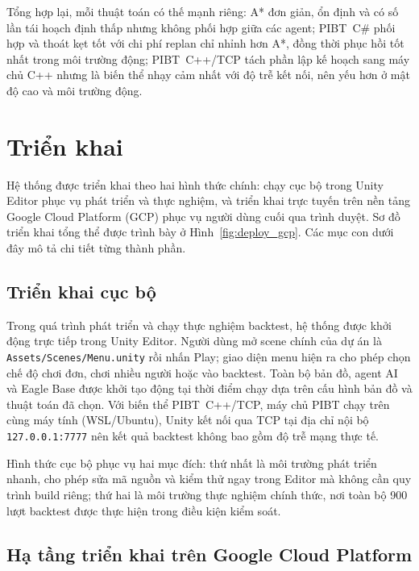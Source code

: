 \documentclass[../DoAn.tex]{subfiles}
\begin{document}
Tổng hợp lại, mỗi thuật toán có thế mạnh riêng: A* đơn giản, ổn định và có số lần tái hoạch định
thấp nhưng không phối hợp giữa các agent; PIBT~C\# phối hợp và thoát kẹt tốt với chi phí replan chỉ
nhỉnh hơn A*, đồng thời phục hồi tốt nhất trong môi trường
động; PIBT~C++/TCP tách phần lập kế hoạch sang máy chủ C++ nhưng là biến thể nhạy cảm nhất với độ
trễ kết nối, nên yếu hơn ở mật độ cao và môi trường động.

\section{Triển khai}
\label{sec:deployment}

Hệ thống được triển khai theo hai hình thức chính: chạy cục bộ trong Unity Editor phục vụ
phát triển và thực nghiệm, và triển khai trực tuyến trên nền tảng Google Cloud Platform
(GCP) phục vụ người dùng cuối qua trình duyệt. Sơ đồ triển khai tổng thể được trình bày ở
Hình~\ref{fig:deploy_gcp}. Các mục con dưới đây mô tả chi tiết từng thành phần.

\subsection{Triển khai cục bộ}

Trong quá trình phát triển và chạy thực nghiệm backtest, hệ thống được khởi động trực tiếp
trong Unity Editor. Người dùng mở scene chính của dự án là
\texttt{Assets/\allowbreak Scenes/\allowbreak Menu.unity} rồi nhấn Play; giao diện menu
hiện ra cho phép chọn chế độ chơi đơn, chơi nhiều người hoặc vào
backtest. Toàn bộ bản đồ, agent AI và Eagle Base được khởi tạo động tại thời điểm chạy dựa
trên cấu hình bản đồ và thuật toán đã chọn. Với biến thể PIBT~C++/TCP, máy chủ PIBT chạy
trên cùng máy tính (WSL/Ubuntu), Unity kết nối qua TCP tại địa chỉ nội bộ
\texttt{127.0.0.1:7777} nên kết quả backtest không bao gồm độ trễ mạng thực tế.

Hình thức cục bộ phục vụ hai mục đích: thứ nhất là môi trường phát triển nhanh, cho phép
sửa mã nguồn và kiểm thử ngay trong Editor mà không cần quy trình build riêng; thứ hai là
môi trường thực nghiệm chính thức, nơi toàn bộ 900 lượt backtest được thực hiện trong
điều kiện kiểm soát.

\subsection{Hạ tầng triển khai trên Google Cloud Platform}
\end{document}
